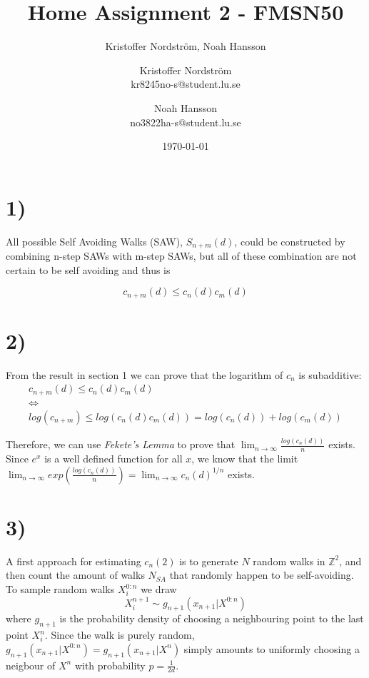 \documentclass[a4paper]{article}
\title{Home Assignment 2 - FMSN50}
\author{Kristoffer Nordström, Noah Hansson}\author{Kristoffer Nordström \\ kr8245no-s@student.lu.se \and  Noah Hansson \\ no3822ha-s@student.lu.se}
\date{\today}
\begin{document}
\maketitle
\newpage

\section*{1)}

All possible Self Avoiding Walks (SAW), $S_{n+m}(d)$, could be constructed by combining n-step SAWs with m-step SAWs, but all of these combination are not certain to
 be self avoiding and thus is

\begin{equation}
    \label{eq:multiplicity}
    c_{n+m}(d)\leq c_n(d)c_m(d)
\end{equation}

\section*{2)}
From the result in section 1 we can prove that the logarithm of $c_n$ is subadditive:
\begin{equation}
    \begin{gathered}
        c_{n+m}(d) \leq c_n(d)c_m(d) \\
        \iff \\
        log(c_{n+m}) \leq log(c_n(d)c_m(d)) = log(c_n(d)) + log(c_m(d))
    \end{gathered}
\end{equation}

Therefore, we can use \textit{Fekete's Lemma} to prove that $\lim_{n\rightarrow\infty} \frac{log(c_n(d))}{n}$ exists. Since $e^x$ is a well defined function for all $x$, we know that the limit $\lim_{n\rightarrow\infty} exp(\frac{log(c_n(d))}{n}) = \lim_{n\rightarrow\infty} c_n(d)^{1/n}$ exists. 

\section*{3)}
A first approach for estimating $c_n(2)$ is to generate $N$ random walks in $\mathbb{Z}^2$, and then count the amount of walks $N_{SA}$ that randomly happen to be self-avoiding. To sample random walks $X_i^{0:n}$ we draw 
\begin{equation}
    X_i^{n+1} \sim g_{n+1}(x_{n+1}|X^{0:n})
\end{equation}
where $g_{n+1}$ is the probability density of choosing a neighbouring point to the last point $X_i^n$. Since the walk is purely random, $g_{n+1}(x_{n+1}|X^{0:n}) = g_{n+1}(x_{n+1}|X^n)$ simply amounts to uniformly choosing a neigbour of $X^n$ with probability $p = \frac{1}{2d}$.
\end{document}
